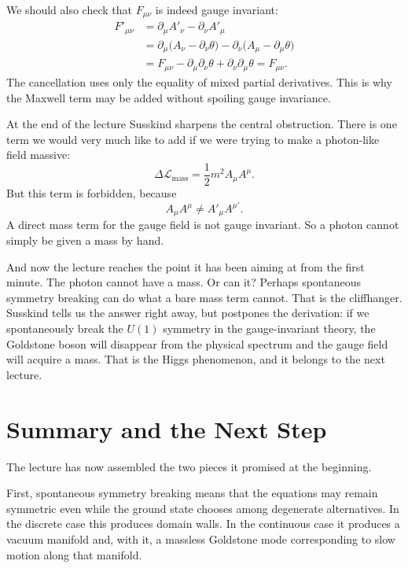 We should also check that \(F_{\mu\nu}\) is indeed gauge invariant:
\begin{align}
F'_{\mu\nu}
&=
\partial_\mu A'_\nu-\partial_\nu A'_\mu
\nonumber\\
&=
\partial_\mu\big(A_\nu-\partial_\nu\theta\big)
-
\partial_\nu\big(A_\mu-\partial_\mu\theta\big)
\nonumber\\
&=
F_{\mu\nu}
-\partial_\mu\partial_\nu\theta
+\partial_\nu\partial_\mu\theta
=
F_{\mu\nu}.
\label{eq:F-invariant-refined}
\end{align}
The cancellation uses only the equality of mixed partial derivatives. This is why the Maxwell term may be added without spoiling gauge invariance.

At the end of the lecture Susskind sharpens the central obstruction. There is one term we would very much like to add if we were trying to make a photon-like field massive:
\begin{equation}
\Delta\mathcal{L}_{\text{mass}}=\frac12 m^2 A_\mu A^\mu.
\label{eq:forbidden-mass-refined}
\end{equation}
But this term is forbidden, because
\[
A_\mu A^\mu \neq A'_\mu A^{\mu\prime}.
\]
A direct mass term for the gauge field is not gauge invariant. So a photon cannot simply be given a mass by hand.

And now the lecture reaches the point it has been aiming at from the first minute. The photon cannot have a mass. Or can it? Perhaps spontaneous symmetry breaking can do what a bare mass term cannot. That is the cliffhanger. Susskind tells us the answer right away, but postpones the derivation: if we spontaneously break the \(U(1)\) symmetry in the gauge-invariant theory, the Goldstone boson will disappear from the physical spectrum and the gauge field will acquire a mass. That is the Higgs phenomenon, and it belongs to the next lecture.

\section{Summary and the Next Step}

The lecture has now assembled the two pieces it promised at the beginning.

First, spontaneous symmetry breaking means that the equations may remain symmetric even while the ground state chooses among degenerate alternatives. In the discrete case this produces domain walls. In the continuous case it produces a vacuum manifold and, with it, a massless Goldstone mode corresponding to slow motion along that manifold.

